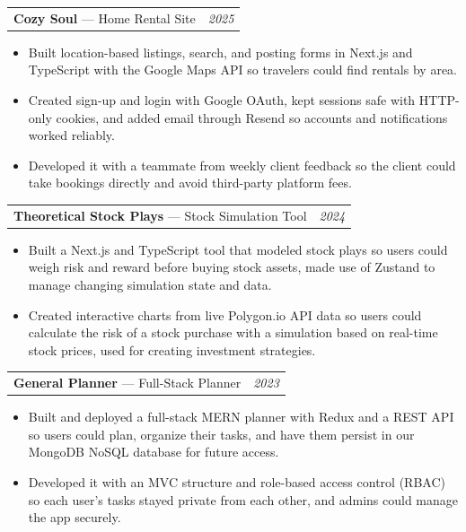 \documentclass[letterpaper]{article}
\makeatletter
\newcommand{\entry}[3]{%
  \vspace{4pt}\needspace{4\baselineskip}
  \begin{tabular*}{\textwidth}{@{}l@{\extracolsep{\fill}}r@{}}
    \textbf{#1}#2 & \textit{#3} \\
  \end{tabular*}\par\vspace{1pt}}
\makeatother
\begin{document}
\entry{Cozy Soul}{ --- Home Rental Site}{2025}
\begin{itemize}
  \item Built location-based listings, search, and posting forms in Next.js and TypeScript with the Google Maps API so travelers could find rentals by area.
  \item Created sign-up and login with Google OAuth, kept sessions safe with HTTP-only cookies, and added email through Resend so accounts and notifications worked reliably.
  \item Developed it with a teammate from weekly client feedback so the client could take bookings directly and avoid third-party platform fees.
\end{itemize}

\entry{Theoretical Stock Plays}{ --- Stock Simulation Tool}{2024}
\begin{itemize}
  \item Built a Next.js and TypeScript tool that modeled stock plays so users could weigh risk and reward before buying stock assets, made use of Zustand to manage changing simulation state and data.
  \item Created interactive charts from live Polygon.io API data so users could calculate the risk of a stock purchase with a simulation based on real-time stock prices, used for creating investment strategies.
\end{itemize}

\entry{General Planner}{ --- Full-Stack Planner}{2023}
\begin{itemize}
  \item Built and deployed a full-stack MERN planner with Redux and a REST API so users could plan, organize their tasks, and have them persist in our MongoDB NoSQL database for future access.
  \item Developed it with an MVC structure and role-based access control (RBAC) so each user's tasks stayed private from each other, and admins could manage the app securely.
\end{itemize}
\end{document}
